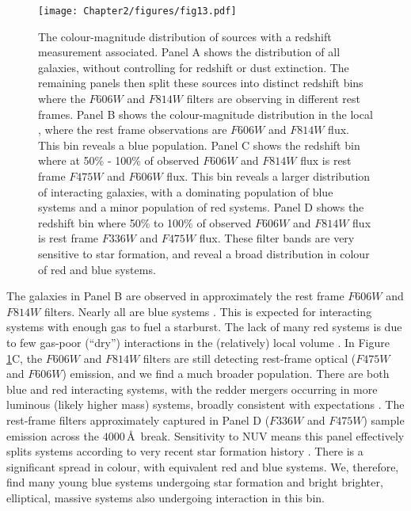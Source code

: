 {\begin{figure}
  \centering
  \texttt{[image: Chapter2/figures/fig13.pdf]}
  \caption[The colour-magnitude distribution of sources with a redshift measurement associated.]{The colour-magnitude distribution of sources with a redshift measurement associated. Panel A shows the distribution of all galaxies, without controlling for redshift or dust extinction. The remaining panels then split these sources into distinct redshift bins where the $F606W$ and $F814W$ filters are observing in different rest frames. Panel B shows the colour-magnitude distribution in the local \DIFdelbeginFL {}\DIFdelendFL \DIFaddbeginFL {}\DIFaddendFL , where the rest frame observations are $F606W$ and $F814W$ flux. This bin reveals a blue population. Panel C shows the redshift bin where at 50\% - 100\% of observed $F606W$ and $F814W$ flux is rest frame $F475W$ and $F606W$ flux. This bin reveals a larger distribution of interacting galaxies, with a dominating population of blue systems and a minor population of red systems. Panel D shows the redshift bin where 50\% to 100\% of observed $F606W$ and $F814W$ flux is rest frame $F336W$ and $F475W$ flux. These filter bands are very sensitive to star formation, and reveal a broad distribution in colour of red and blue systems.}
  \label{fig:colour-magnitude}
\end{figure}

The galaxies in Panel B are observed in approximately the rest frame $F606W$ and $F814W$ filters. Nearly all are blue systems \citep[by general definitions at various redshifts, \emph{e.g.},][]{2003MNRAS.341...33K, 2012ApJ...745..179W, 2014MNRAS.440..889S}. This is expected for interacting systems with enough gas to fuel a starburst. The lack of many red systems is due to few gas-poor (``dry'') interactions in the (relatively) local volume \citep{2009A&A...501..505L}. In Figure \ref{fig:colour-magnitude}C, the $F606W$ and $F814W$ filters are still detecting rest-frame optical ($F475W$ and $F606W$) emission, and we find a much broader population. There are both blue and red interacting systems, with the redder mergers occurring in more luminous (likely higher mass) systems, broadly consistent with expectations \citep{2005AJ....130.2647V, 2008ApJ...672..177L}. The rest-frame filters approximately captured in Panel D ($F336W$ and $F475W$) sample emission across the $4000$\,\AA\ break. Sensitivity to NUV means this panel effectively splits systems according to very recent star formation history \citep{2014MNRAS.440..889S, 2015MNRAS.450..435S}. There is a significant spread in colour, with equivalent red and blue systems. We, therefore, find many young blue systems undergoing star formation and bright brighter, elliptical, massive systems also undergoing interaction in this bin.

}
